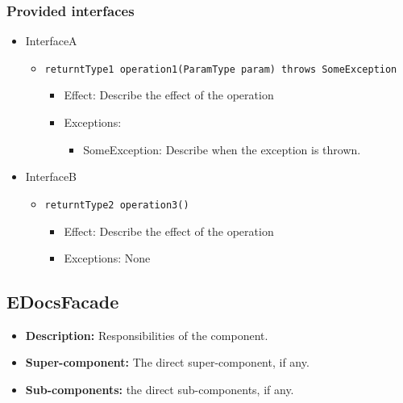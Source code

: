 \documentclass[a4paper,10pt]{article}
\begin{document}
\subsubsection*{Provided interfaces}
\begin{itemize}
    \item InterfaceA
    \begin{itemize}
        \item \texttt{returntType1 operation1(ParamType param) throws SomeException}
        \begin{itemize}
            \item Effect: Describe the effect of the operation
            \item Exceptions:
            \begin{itemize}
                \item SomeException: Describe when the exception is thrown.
            \end{itemize}
        \end{itemize}
    \end{itemize}

    \item InterfaceB
    \begin{itemize}
        \item \texttt{returntType2 operation3()}
        \begin{itemize}
            \item Effect: Describe the effect of the operation
            \item Exceptions: None
        \end{itemize}
    \end{itemize}
\end{itemize}

\subsection{EDocsFacade}
\begin{itemize}
    \item \textbf{Description:} Responsibilities of the component.
    \item \textbf{Super-component:} The direct super-component, if any.
    \item \textbf{Sub-components:} the direct sub-components, if any.
\end{itemize}
\end{document}
